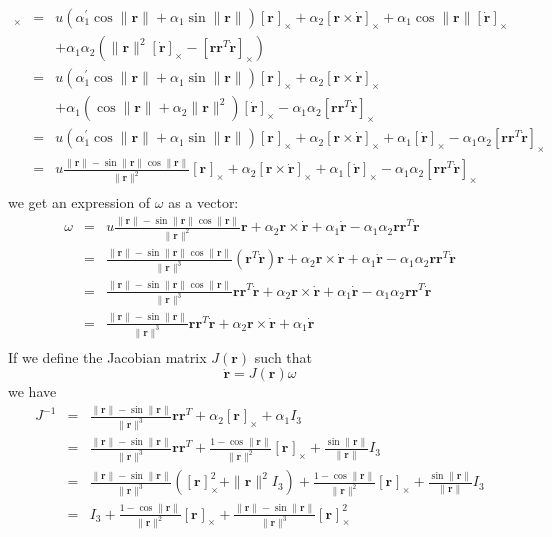 \documentclass {article}
\newcommand\rot{\mathbf{r}}
\newcommand\rcross[1]{[\rot_{#1}]_{\times}}
\newcommand\omegacross{[\omega]_{\times}}
\newcommand\rdotcross{\left[\dot{\rot}\right]_{\times}}
\newcommand\normr{\|\rot\|}
\newcommand\alphap{\alpha^{\prime}}
\begin{document}
\begin{eqnarray*}
\omegacross &=&
u\left(\alphap_1 \cos\normr + \alpha_1\sin\normr\right) \rcross{} + \alpha_2\left[\rot\times\dot{\rot}\right]_{\times} + \alpha_1\cos\normr\rdotcross\\
&& + \alpha_1 \alpha_2 \left(\normr^2\rdotcross - \left[\rot\rot^T\dot{\rot}\right]_{\times}\right)\\
&=&u\left(\alphap_1 \cos\normr + \alpha_1\sin\normr\right) \rcross{} + \alpha_2\left[\rot\times\dot{\rot}\right]_{\times}\\
&& + \alpha_1\left(\cos\normr + \alpha_2\normr^2\right)\rdotcross - \alpha_1 \alpha_2\left[\rot\rot^T\dot{\rot}\right]_{\times}\\
&=&u\left(\alphap_1 \cos\normr + \alpha_1\sin\normr\right) \rcross{} + \alpha_2\left[\rot\times\dot{\rot}\right]_{\times} + \alpha_1\rdotcross - \alpha_1 \alpha_2\left[\rot\rot^T\dot{\rot}\right]_{\times}\\
&=&u\frac{\normr -\sin\normr\cos\normr}{\normr^2} \rcross{} + \alpha_2\left[\rot\times\dot{\rot}\right]_{\times} + \alpha_1\rdotcross - \alpha_1 \alpha_2\left[\rot\rot^T\dot{\rot}\right]_{\times}\\
\end{eqnarray*}
we get an expression of $\omega$ as a vector:
\begin{eqnarray*}
\omega &=&u\frac{\normr -\sin\normr\cos\normr}{\normr^2} \rot + \alpha_2\rot\times\dot{\rot} + \alpha_1\dot{\rot} - \alpha_1 \alpha_2\rot\rot^T\dot{\rot}\\
&=&\frac{\normr -\sin\normr\cos\normr}{\normr^3}(\rot^T\dot{\rot}) \rot + \alpha_2\rot\times\dot{\rot} + \alpha_1\dot{\rot} - \alpha_1 \alpha_2\rot\rot^T\dot{\rot}\\
&=&\frac{\normr -\sin\normr\cos\normr}{\normr^3}\rot\rot^T\dot{\rot} + \alpha_2\rot\times\dot{\rot} + \alpha_1\dot{\rot} - \alpha_1 \alpha_2\rot\rot^T\dot{\rot}\\
&=&\frac{\normr -\sin\normr}{\normr^3}\rot\rot^T\dot{\rot} + \alpha_2\rot\times\dot{\rot} + \alpha_1\dot{\rot}\\
\end{eqnarray*}
If we define the Jacobian matrix $J(\rot)$  such that
\begin{equation}\label{eq:jacobian}
\dot{\rot} = J(\rot)\omega
\end{equation}
we have
\begin{eqnarray*}
J^{-1} &=& \frac{\normr -\sin\normr}{\normr^3}\rot\rot^T + \alpha_2\rcross{} + \alpha_1 I_3\\
&=& \frac{\normr -\sin\normr}{\normr^3}\rot\rot^T + \frac{1 - \cos \normr}{\normr^2}\rcross{} + \frac{\sin \normr}{\normr} I_3\\
&=& \frac{\normr -\sin\normr}{\normr^3}(\rcross{}^2 + \normr^2 I_3) + \frac{1 - \cos \normr}{\normr^2}\rcross{} + \frac{\sin \normr}{\normr} I_3\\
&=& I_3  + \frac{1 - \cos \normr}{\normr^2}\rcross{} + \frac{\normr -\sin\normr}{\normr^3}\rcross{}^2\\
\end{eqnarray*}
\end{document}
